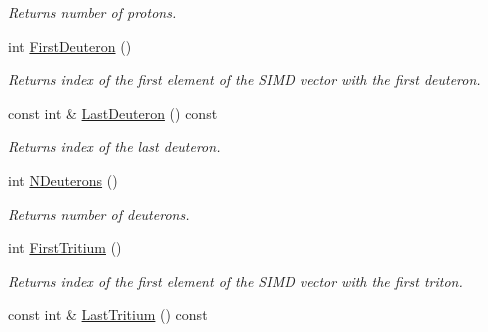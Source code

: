 \begin{DoxyCompactItemize}
\begin{DoxyCompactList}\small\item\em Returns number of protons. \end{DoxyCompactList}\item 
int \hyperlink{classKFPTrackVector_ada6e1bfb855489e3ed0cf4f59288de28}{First\+Deuteron} ()\hypertarget{classKFPTrackVector_ada6e1bfb855489e3ed0cf4f59288de28}{}\label{classKFPTrackVector_ada6e1bfb855489e3ed0cf4f59288de28}

\begin{DoxyCompactList}\small\item\em Returns index of the first element of the S\+I\+MD vector with the first deuteron. \end{DoxyCompactList}\item 
const int \& \hyperlink{classKFPTrackVector_ab88ed216e1e6a70de587d2cc0f740f1c}{Last\+Deuteron} () const \hypertarget{classKFPTrackVector_ab88ed216e1e6a70de587d2cc0f740f1c}{}\label{classKFPTrackVector_ab88ed216e1e6a70de587d2cc0f740f1c}

\begin{DoxyCompactList}\small\item\em Returns index of the last deuteron. \end{DoxyCompactList}\item 
int \hyperlink{classKFPTrackVector_a45c7b0bb67dea3969e92c583b321b7b1}{N\+Deuterons} ()\hypertarget{classKFPTrackVector_a45c7b0bb67dea3969e92c583b321b7b1}{}\label{classKFPTrackVector_a45c7b0bb67dea3969e92c583b321b7b1}

\begin{DoxyCompactList}\small\item\em Returns number of deuterons. \end{DoxyCompactList}\item 
int \hyperlink{classKFPTrackVector_ace381e03fd0daab5614ef7dd31973128}{First\+Tritium} ()\hypertarget{classKFPTrackVector_ace381e03fd0daab5614ef7dd31973128}{}\label{classKFPTrackVector_ace381e03fd0daab5614ef7dd31973128}

\begin{DoxyCompactList}\small\item\em Returns index of the first element of the S\+I\+MD vector with the first triton. \end{DoxyCompactList}\item 
const int \& \hyperlink{classKFPTrackVector_a7cd61a5f5b8232d237feafccc9abab8b}{Last\+Tritium} () const \hypertarget{classKFPTrackVector_a7cd61a5f5b8232d237feafccc9abab8b}{}\label{classKFPTrackVector_a7cd61a5f5b8232d237feafccc9abab8b}


\end{DoxyCompactItemize}
